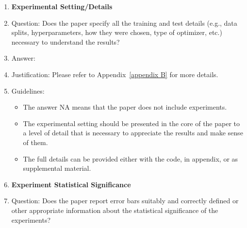 \documentclass{article}
\begin{document}
\begin{enumerate}
\begin{itemize}
        \item The instructions should contain the exact command and environment needed to run to reproduce the results. See the NeurIPS code and data submission guidelines (\url{https://nips.cc/public/guides/CodeSubmissionPolicy}) for more details.
        \item The authors should provide instructions on data access and preparation, including how to access the raw data, preprocessed data, intermediate data, and generated data, etc.
        \item The authors should provide scripts to reproduce all experimental results for the new proposed method and baselines. If only a subset of experiments are reproducible, they should state which ones are omitted from the script and why.
        \item At submission time, to preserve anonymity, the authors should release anonymized versions (if applicable).
        \item Providing as much information as possible in supplemental material (appended to the paper) is recommended, but including URLs to data and code is permitted.
    \end{itemize}
\item {\bf Experimental Setting/Details}
    \item[] Question: Does the paper specify all the training and test details (e.g., data splits, hyperparameters, how they were chosen, type of optimizer, etc.) necessary to understand the results?
    \item[] Answer: \answerYes{}
    \item[] Justification: Please refer to Appendix~\ref{appendix B} for more details.
    \item[] Guidelines:
    \begin{itemize}
        \item The answer NA means that the paper does not include experiments.
        \item The experimental setting should be presented in the core of the paper to a level of detail that is necessary to appreciate the results and make sense of them.
        \item The full details can be provided either with the code, in appendix, or as supplemental material.
    \end{itemize}
\item {\bf Experiment Statistical Significance}
    \item[] Question: Does the paper report error bars suitably and correctly defined or other appropriate information about the statistical significance of the experiments?

\end{enumerate}
\end{document}
